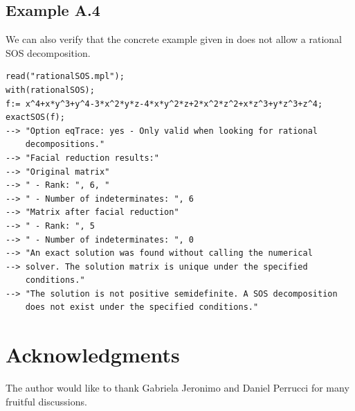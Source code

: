 \documentclass{amsart}
\theoremstyle{definition}
\theoremstyle{remark}
\numberwithin{equation}{section}
\begin{document}
\subsection*{Example A.4}
We can also verify that the concrete example given in \cite[Section 2]{scheiderer} does not allow a rational SOS decomposition.

\begin{verbatim}
read("rationalSOS.mpl");
with(rationalSOS);
f:= x^4+x*y^3+y^4-3*x^2*y*z-4*x*y^2*z+2*x^2*z^2+x*z^3+y*z^3+z^4;
exactSOS(f);
--> "Option eqTrace: yes - Only valid when looking for rational
    decompositions."
--> "Facial reduction results:"
--> "Original matrix"
--> " - Rank: ", 6, "
--> " - Number of indeterminates: ", 6
--> "Matrix after facial reduction"
--> " - Rank: ", 5
--> " - Number of indeterminates: ", 0
--> "An exact solution was found without calling the numerical
--> solver. The solution matrix is unique under the specified
    conditions."
--> "The solution is not positive semidefinite. A SOS decomposition
    does not exist under the specified conditions."
\end{verbatim}


\section*{Acknowledgments}
The author would like to thank Gabriela Jeronimo and Daniel Perrucci for many fruitful discussions.



\end{document}
